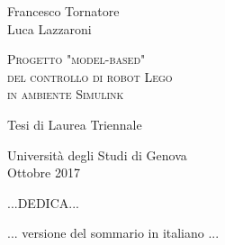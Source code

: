 \documentclass[a4paper,12pt,twoside,openright]{book}
\newenvironment{abstract}
{\cleardoublepage
	\thispagestyle{empty}
	\null \vfill\begin{center}
		\bfseries \abstractname \end{center}}
{\vfill\null}
\begin{document}
\thispagestyle{empty}
\begin{center}
	Francesco Tornatore\\
	Luca Lazzaroni
\end{center}

\null{}

\begin{center}
	\begin{Huge}
		\textsc{Progetto "model-based"\\
			 del controllo di robot Lego\\
			 in ambiente Simulink\\}
	\end{Huge}
\end{center}
\begin{center}
	Tesi di Laurea Triennale
\end{center}

\null
\null
\vfill
\begin{center}
	Università degli Studi di Genova\\
	Ottobre 2017
\end{center}
\clearpage


\begin{flushright}
	\null{}
	...DEDICA...
	\null
\end{flushright}

\begin{abstract}
	\begin{center}
		... versione del sommario in italiano ...
	\end{center}
\end{abstract}


\tableofcontents





\end{document}
